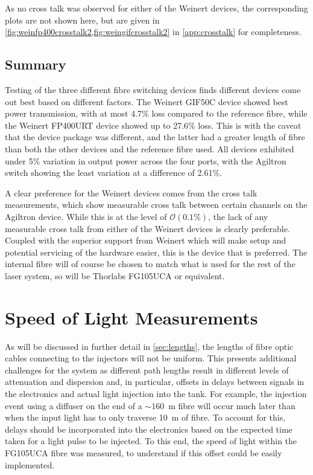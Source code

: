 \documentclass[a4paper,11pt]{article}
\let\oldsim\sim
\renewcommand{\sim}{{\oldsim}}
\begin{document}
As no cross talk was observed for either of the Weinert devices, the corresponding plots are not shown here, but are given in \cref{fig:weinfp400crosstalk2,fig:weingifcrosstalk2} in \cref{app:crosstalk} for completeness.

\subsection{Summary}
Testing of the three different fibre switching devices finds different devices come out best based on different factors. The Weinert GIF50C device showed best power transmission, with at most 4.7\% loss compared to the reference fibre, while the Weinert FP400URT device showed up to 27.6\% loss. This is with the caveat that the device package was different, and the latter had a greater length of fibre than both the other devices and the reference fibre used. All devices exhibited under 5\% variation in output power across the four ports, with the Agiltron switch showing the least variation at a difference of 2.61\%.

A clear preference for the Weinert devices comes from the cross talk measurements, which show measurable cross talk between certain channels on the Agiltron device. While this is at the level of $\mathcal{O}(0.1\%)$, the lack of any measurable cross talk from either of the Weinert devices is clearly preferable. Coupled with the superior support from Weinert which will make setup and potential servicing of the hardware easier, this is the device that is preferred. The internal fibre will of course be chosen to match what is used for the rest of the laser system, so will be Thorlabs FG105UCA or equivalent.


\section{Speed of Light Measurements}\label{sec:c}

As will be discussed in further detail in \cref{sec:lengths}, the lengths of fibre optic cables connecting to the injectors will not be uniform. This presents additional challenges for the system as different path lengths result in different levels of attenuation and dispersion and, in particular, offsets in delays between signals in the electronics and actual light injection into the tank. For example, the injection event using a diffuser on the end of a $\sim160$~m fibre will occur much later than when the input light has to only traverse 10~m of fibre. To account for this, delays should be incorporated into the electronics based on the expected time taken for a light pulse to be injected. To this end, the speed of light within the FG105UCA fibre was measured, to understand if this offset could be easily implemented.
\end{document}
